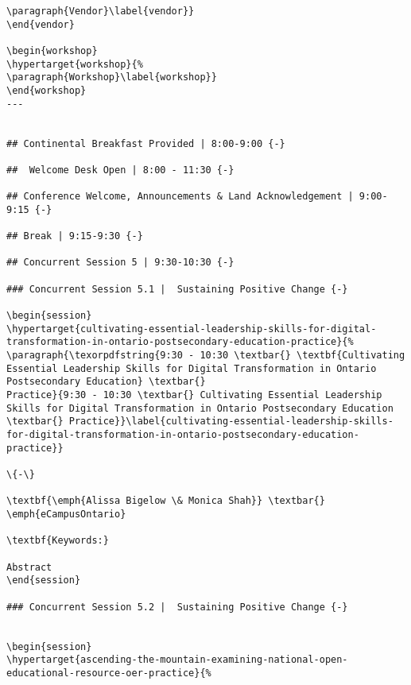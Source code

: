 \documentclass[
]{book}
\begin{document}
\begin{verbatim}
\paragraph{Vendor}\label{vendor}}
\end{vendor}

\begin{workshop}
\hypertarget{workshop}{%
\paragraph{Workshop}\label{workshop}}
\end{workshop}
--- 


## Continental Breakfast Provided | 8:00-9:00 {-}

##  Welcome Desk Open | 8:00 - 11:30 {-}

## Conference Welcome, Announcements & Land Acknowledgement | 9:00-9:15 {-}

## Break | 9:15-9:30 {-}

## Concurrent Session 5 | 9:30-10:30 {-}

### Concurrent Session 5.1 |  Sustaining Positive Change {-}

\begin{session}
\hypertarget{cultivating-essential-leadership-skills-for-digital-transformation-in-ontario-postsecondary-education-practice}{%
\paragraph{\texorpdfstring{9:30 - 10:30 \textbar{} \textbf{Cultivating
Essential Leadership Skills for Digital Transformation in Ontario
Postsecondary Education} \textbar{}
Practice}{9:30 - 10:30 \textbar{} Cultivating Essential Leadership Skills for Digital Transformation in Ontario Postsecondary Education \textbar{} Practice}}\label{cultivating-essential-leadership-skills-for-digital-transformation-in-ontario-postsecondary-education-practice}}

\{-\}

\textbf{\emph{Alissa Bigelow \& Monica Shah}} \textbar{}
\emph{eCampusOntario}

\textbf{Keywords:}

Abstract
\end{session}

### Concurrent Session 5.2 |  Sustaining Positive Change {-}


\begin{session}
\hypertarget{ascending-the-mountain-examining-national-open-educational-resource-oer-practice}{%

\end{verbatim}
\end{document}
